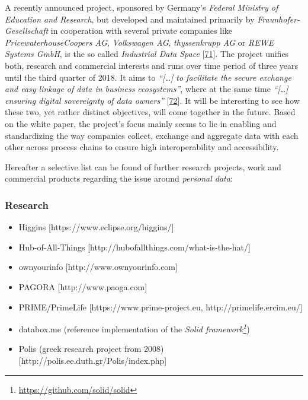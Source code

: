\documentclass[12pt,english,a4paper,titlepage,cleardoublepage=empty,dottedtoc]{report}
\renewcommand{\href}[2]{#2\footnote{\url{#1}}}
\providecommand{\tightlist}{%
  \setlength{\itemsep}{0pt}\setlength{\parskip}{0pt}}
\begin{document}
A recently announced project, sponsored by Germany's \emph{Federal
Ministry of Education and Research}, but developed and maintained
primarily by \emph{Fraunhofer-Gesellschaft} in cooperation with several
private companies like \emph{PricewaterhouseCoopers AG},
\emph{Volkswagen AG}, \emph{thyssenkrupp AG} or \emph{REWE Systems
GmbH}, is the so called \emph{Industrial Data Space}
{[}\protect\hyperlink{ref-web_industrial-data-space}{71}{]}. The project
unifies both, research and commercial interests and runs over time
period of three years until the third quarter of 2018. It aims to
\emph{``{[}\ldots{}{]} to facilitate the secure exchange and easy
linkage of data in business ecosystems''}, where at the same time
\emph{``{[}\ldots{}{]} ensuring digital sovereignty of data owners''}
{[}\protect\hyperlink{ref-whitepaper_2016_industrial-data-space}{72}{]}.
It will be interesting to see how these two, yet rather distinct
objectives, will come together in the future. Based on the white paper,
the project's focus mainly seems to lie in enabling and standardizing
the way companies collect, exchange and aggregate data with each other
across process chains to ensure high interoperability and accessibility.

Hereafter a selective list can be found of further research projects,
work and commercial products regarding the issue around \emph{personal
data}:

\subsubsection{Research}\label{research-1}

\begin{itemize}
\tightlist
\item
  Higgins {[}https://www.eclipse.org/higgins/{]}
\item
  Hub-of-All-Things {[}http://hubofallthings.com/what-is-the-hat/{]}
\item
  ownyourinfo {[}http://www.ownyourinfo.com{]}
\item
  PAGORA {[}http://www.paoga.com{]}
\item
  PRIME/PrimeLife {[}https://www.prime-project.eu,
  http://primelife.ercim.eu/{]}
\item
  databox.me (reference implementation of the
  \emph{\href{https://github.com/solid/solid}{Solid framework}})
\item
  Polis (greek research project from 2008)
  {[}http://polis.ee.duth.gr/Polis/index.php{]}
\end{itemize}
\end{document}
